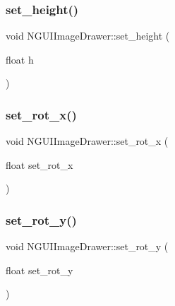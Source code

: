 \hypertarget{class_n_g_u_i_image_drawer_a4b635f6fc099f1d061e5d4642c536266}{}\label{class_n_g_u_i_image_drawer_a4b635f6fc099f1d061e5d4642c536266} 
\subsubsection{\texorpdfstring{set\+\_\+height()}{set\_height()}}
{\footnotesize\ttfamily void N\+G\+U\+I\+Image\+Drawer\+::set\+\_\+height (\begin{DoxyParamCaption}\item[{float}]{h }\end{DoxyParamCaption})}

\hypertarget{class_n_g_u_i_image_drawer_a80bde52ad2f05dd5d6ac85837420365a}{}\label{class_n_g_u_i_image_drawer_a80bde52ad2f05dd5d6ac85837420365a} 
\subsubsection{\texorpdfstring{set\+\_\+rot\+\_\+x()}{set\_rot\_x()}}
{\footnotesize\ttfamily void N\+G\+U\+I\+Image\+Drawer\+::set\+\_\+rot\+\_\+x (\begin{DoxyParamCaption}\item[{float}]{set\+\_\+rot\+\_\+x }\end{DoxyParamCaption})}

\hypertarget{class_n_g_u_i_image_drawer_ac7c4f8bb150f1bd0903f9c3c08b34d6e}{}\label{class_n_g_u_i_image_drawer_ac7c4f8bb150f1bd0903f9c3c08b34d6e} 
\subsubsection{\texorpdfstring{set\+\_\+rot\+\_\+y()}{set\_rot\_y()}}
{\footnotesize\ttfamily void N\+G\+U\+I\+Image\+Drawer\+::set\+\_\+rot\+\_\+y (\begin{DoxyParamCaption}\item[{float}]{set\+\_\+rot\+\_\+y }\end{DoxyParamCaption})}

